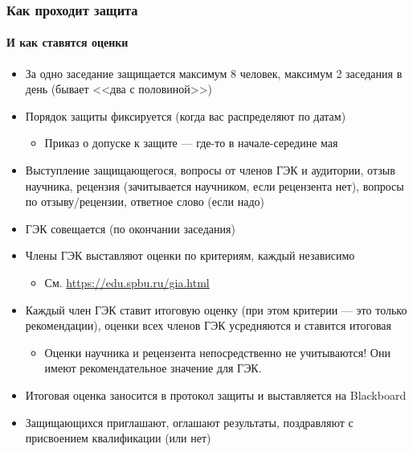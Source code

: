 \documentclass[xetex,mathserif,serif]{beamer}
\begin{document}
    \begin{frame}
        \frametitle{Как проходит защита}
        \framesubtitle{И как ставятся оценки}
        \begin{footnotesize}
            \begin{itemize}
                \item За одно заседание защищается максимум 8 человек, максимум 2 заседания в день (бывает <<два с половиной>>)
                \item Порядок защиты фиксируется (когда вас распределяют по датам)
                \begin{itemize}
                    \item \footnotesize{Приказ о допуске к защите --- где-то в начале-середине мая}
                \end{itemize}
                \item Выступление защищающегося, вопросы от членов ГЭК и аудитории, отзыв научника, рецензия (зачитывается научником, если рецензента нет), вопросы по отзыву/рецензии, ответное слово (если надо)
                \item ГЭК совещается (по окончании заседания)
                \item Члены ГЭК выставляют оценки по критериям, каждый независимо
                \begin{itemize}
                    \item \footnotesize{См. \url{https://edu.spbu.ru/gia.html}}
                \end{itemize}
                \item Каждый член ГЭК ставит итоговую оценку (при этом критерии --- это только рекомендации), оценки всех членов ГЭК усредняются и ставится итоговая
                \begin{itemize}
                    \item \footnotesize{Оценки научника и рецензента непосредственно не учитываются! Они имеют рекомендательное значение для ГЭК.}
                \end{itemize}
                \item Итоговая оценка заносится в протокол защиты и выставляется на Blackboard
                \item Защищающихся приглашают, оглашают результаты, поздравляют с присвоением квалификации (или нет)
            \end{itemize}
        \end{footnotesize}
    \end{frame}
\end{document}
